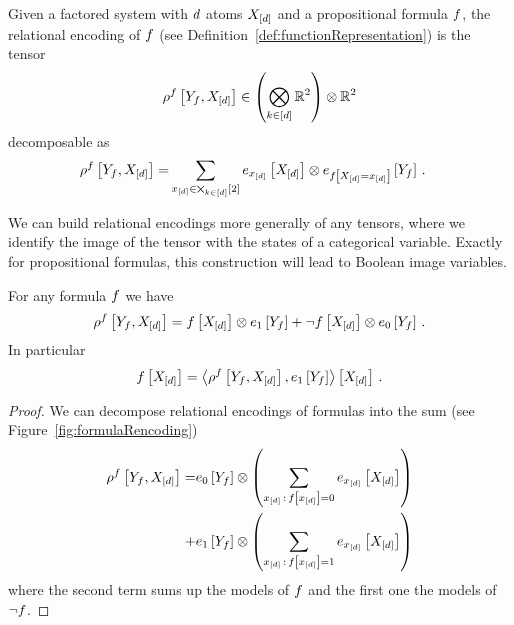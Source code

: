 Given a factored system with $d$ atoms $X_{[d]}$ and a propositional formula $f$, the relational encoding of $f$ (see Definition~\ref{def:functionRepresentation}) is the tensor
	\[ \rho^{f}\left[Y_{f},X_{[d]}\right] \in  \left(\bigotimes_{k\in[d]}\mathbb{R}^2 \right) \otimes \mathbb{R}^2 \]
decomposable as
\begin{align} 
	\rho^{f}\left[Y_{f},X_{[d]}\right] 
	= & \sum_{x_{[d]}\in\bigtimes_{k\in[d]}[2]}  e_{x_{[d]}}\left[X_{[d]}\right] \otimes e_{f\left[X_{[d]}=x_{[d]}\right]}\left[Y_{f}\right] \, . 
\end{align}

We can build relational encodings more generally of any tensors, where we identify the image of the tensor with the states of a categorical variable.
Exactly for propositional formulas, this construction will lead to Boolean image variables.


\begin{lemma}\label{lem:formulaEncodingDecomposition}
	For any formula $f$ we have
		\[ \rho^{f}\left[Y_{f},X_{[d]}\right] 
		= f\left[X_{[d]}\right] \otimes e_1\left[Y_{f}\right] 
		+ \lnot f\left[X_{[d]}\right] \otimes  e_0\left[Y_{f}\right] \, . 
		 \]
	In particular
		\[ f\left[X_{[d]}\right] = \left\langle 
		\rho^{f}\left[Y_{f},X_{[d]}\right],e_1\left[Y_{f}\right]
		\right\rangle \left[ X_{[d]} \right] \, . \]
\end{lemma}
\begin{proof}
	We can decompose relational encodings of formulas into the sum (see Figure~\ref{fig:formulaRencoding}) %
	\begin{align} 
		 \rho^{f}\left[Y_{f},X_{[d]}\right]  
		 = & e_0\left[Y_{f}\right] \otimes \left( \sum_{x_{[d]}\,:\,f\left[x_{[d]}\right]=0}  e_{x_{[d]}}\left[X_{[d]}\right] \right) \\
		 + & e_1\left[Y_{f}\right] \otimes \left( \sum_{x_{[d]}\,:\,f\left[x_{[d]}\right]=1}  e_{x_{[d]}}\left[X_{[d]}\right] \right)
	\end{align}
	where the second term sums up the models of $f$ and the first one the models of $\lnot f$.
\end{proof}


